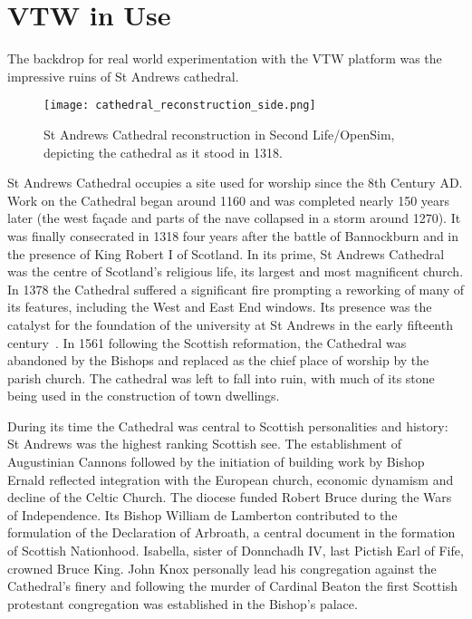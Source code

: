 \section{VTW in Use}

\newcommand{\thinkpadFootnote}{\footnote{\url{http://support.lenovo.com/us/en/documents/pd012148}}}

\newcommand{\wrtFootnote}{\footnote{\url{http://support.linksys.com/en-eu/support/routers/WRT54G}}}


The backdrop for real world experimentation with the VTW platform was the impressive ruins of St Andrews cathedral.

\begin{figure}[h]
\centering
  \texttt{[image: cathedral\_reconstruction\_side.png]}
  \caption{St Andrews Cathedral reconstruction in Second Life/OpenSim, depicting the cathedral as it stood in 1318.}
  \label{cathedral_reconstruction_side.png}
\end{figure}



St Andrews Cathedral occupies a site used for worship since the 8th Century AD. Work on the Cathedral began around 1160 and was completed nearly 150 years later (the west fa\c{c}ade and parts of the nave collapsed in a storm around 1270). It was finally consecrated in 1318 four years after the battle of Bannockburn and in the presence of King Robert I of Scotland. In its prime, St Andrews Cathedral was the centre of Scotland’s religious life, its largest and most magnificent church. In 1378 the Cathedral suffered a significant fire prompting
a reworking of many of its features, including the West and East End windows. Its presence was the catalyst for the foundation of the university at St Andrews in the early fifteenth century~\cite{Fawcett2011}. In 1561 following the Scottish reformation, the Cathedral was abandoned by the Bishops and replaced as the chief place of worship by the parish church. The cathedral was left to fall into ruin, with much of its stone being used in the construction of town dwellings.

During its time the Cathedral was central to Scottish personalities and history: St Andrews was the highest ranking Scottish see. The establishment of Augustinian Cannons followed by the initiation of
building work by Bishop Ernald reflected integration with the European church, economic dynamism and decline of the Celtic Church. The diocese funded Robert Bruce during the Wars of Independence. Its Bishop William de Lamberton contributed to the formulation of the Declaration of Arbroath, a central document in the formation of
Scottish Nationhood. Isabella, sister of Donnchadh IV, last Pictish Earl of Fife, crowned Bruce King. John Knox personally lead his congregation against the Cathedral’s finery and following the murder of Cardinal Beaton the first Scottish protestant congregation was established in the Bishop’s palace.


